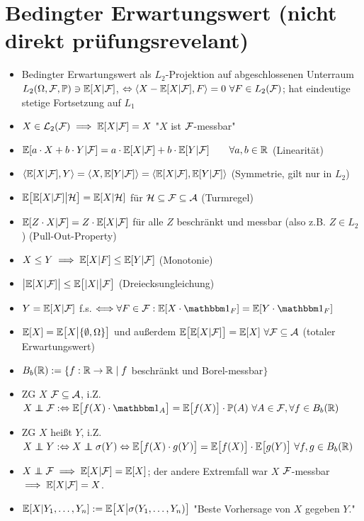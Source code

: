 \documentclass[12pt]{scrartcl}
\begin{document}
	\section{Bedingter Erwartungswert (nicht direkt prüfungsrevelant)}
	\begin{itemize}
		\item Bedingter Erwartungswert als $L_2$-Projektion auf abgeschlossenen Unterraum $L_2(\Omega,\mathcal{F},\mathbb{P})\ni\mathbb{E}[X|\mathcal{F}]$, $\Leftrightarrow\langle X-\mathbb{E}[X| \mathcal{F}],F\rangle=0~\forall F\in L_2(\mathcal{F})$; hat eindeutige stetige Fortsetzung auf $L_1$
		\item $X\in\mathcal{L}_2(\mathcal{F})\implies\mathbb{E}[X|\mathcal{F}]=X$ "$X$ ist $\mathcal{F}$-messbar"
		\item $\mathbb{E}[a\cdot X+b\cdot Y|\mathcal{F}]=a\cdot\mathbb{E}[X|\mathcal{F}]+b\cdot\mathbb{E}[Y|\mathcal{F}]\qquad\forall a,b\in\mathbb{R}$ (Linearität)
		\item $\langle\mathbb{E}[X|\mathcal{F}],Y\rangle=\langle X,\mathbb{E}[Y|\mathcal{F}]\rangle=\langle\mathbb{E}[X|\mathcal{F}],\mathbb{E}[Y|\mathcal{F}]\rangle$ (Symmetrie, gilt nur in $L_2$)
		\item $\mathbb{E}\big[\mathbb{E}[X|\mathcal{F}]\big|\mathcal{H}\big]=\mathbb{E}[X|\mathcal{H}]$ für $\mathcal{H}\subseteq\mathcal{F}\subseteq\mathcal{A}$ (Turmregel)
		\item $\mathbb{E}[Z\cdot X|\mathcal{F}]=Z\cdot\mathbb{E}[X|\mathcal{F}]$ für alle $Z$ beschränkt und messbar (also z.B. $Z\in L_2$) (Pull-Out-Property)
		\item $X\leq Y\implies \mathbb{E}[X|F]\leq\mathbb{E}[Y|\mathcal{F}]$ (Monotonie)
		\item $\big|\mathbb{E}[X|\mathcal{F}]\big|\leq\mathbb{E}\big[|X|\big|\mathcal{F}\big]$ (Dreiecksungleichung)
		\item $Y=\mathbb{E}[X|\mathcal{F}]$ f.s. $\Longleftrightarrow\forall F\in\F:\E[X\cdot\indi_F]=\E[Y\cdot\indi_F]$
		\item $\mathbb{E}[X]=\mathbb{E}\big[X\big|\lbrace\emptyset,\Omega\rbrace\big]$ und außerdem $\mathbb{E}\big[\mathbb{E}[X|\mathcal{F}]\big]=\mathbb{E}[X]~\forall\mathcal{F}\subseteq\mathcal{A}$ (totaler Erwartungswert)
		\item $B_b(\mathbb{R}):=\lbrace f:\mathbb{R}\to\mathbb{R}\mid f$ beschränkt und Borel-messbar$\rbrace$
		\item ZG $X$  $\mathcal{F}\subseteq\mathcal{A}$, i.Z. $X\unab\F:\gdw\E\big[f(X)\cdot\indi_A\big]=\E\big[f(X)\big]\cdot\P(A)~\forall A\in\F,\forall f\in B_b(\R)$
		\item ZG $X$ heißt  $Y$, i.Z. $X\unab Y:\gdw X\unab\sigma(Y)\gdw\E\big[f(X)\cdot g(Y)\big]=\E\big[f(X)\big]\cdot\E\big[g(Y)\big]~\forall f,g\in B_b(\R)$
		\item $X\unab\F\implies\E[X|\F]=\E[X]$; der andere Extremfall war $X$ $\mathcal{F}$-messbar $\implies\mathbb{E}[X|\mathcal{F}]=X$.
		\item $\mathbb{E}[X|Y_1,\ldots,Y_n]:=\mathbb{E}\big[X\big|\sigma(Y_1,\ldots,Y_n)\big]$ "Beste Vorhersage von $X$ gegeben $Y$."
	\end{itemize}
	
\end{document}
